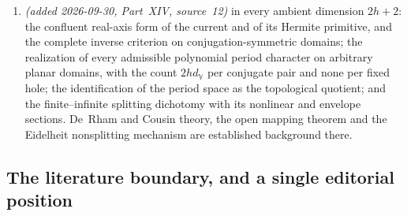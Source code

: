 \documentclass[11pt,a4paper]{article}
\numberwithin{equation}{section}
\theoremstyle{definition}
\theoremstyle{remark}
\theoremstyle{plain}
\newcommand{\VV}{\mathbb V}                       %
\newcommand{\dV}{d_{\VV}}                         %
\begin{document}
\begin{enumerate}[label=\textup{(\alph*)}]
energy constants with an $L^\alpha$ classification of residue classes. The
Fueter--Sce mapping, local inversion and the polynomial kernel are
established background there too.
\item \emph{(added 2026-09-30, Part~XIV, source~12)} in every ambient
dimension $2h+2$: the confluent real-axis form of the current and of its
Hermite primitive, and the complete inverse criterion on
conjugation-symmetric domains; the realization of every admissible
polynomial period character on arbitrary planar domains, with the count
$2h\dV$ per conjugate pair and none per fixed hole; the identification of
the period space as the topological quotient; and the finite--infinite
splitting dichotomy with its nonlinear and envelope sections. De~Rham and
Cousin theory, the open mapping theorem and the Eidelheit nonsplitting
mechanism are established background there.
\end{enumerate}

\subsection{The literature boundary, and a single editorial position}
\label{f:sub:literature}
\end{document}

